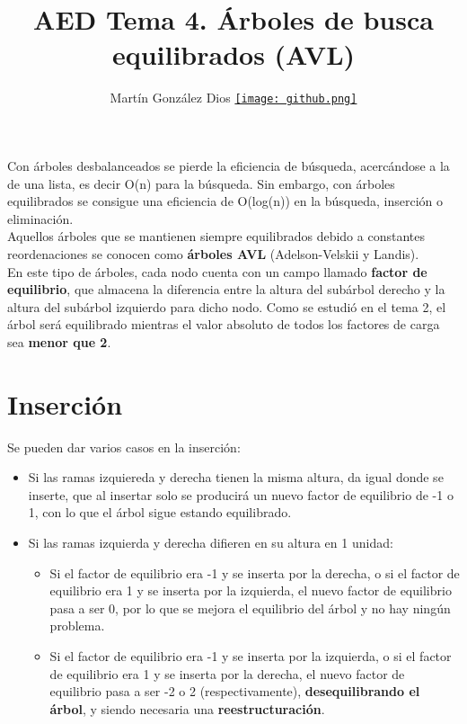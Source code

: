 \documentclass{article}
\title{AED Tema 4. Árboles de busca equilibrados (AVL)}
\author{Martín González Dios
\href{https://github.com/martindios}{\texttt{[image: github.png]}}}
\date{}
\begin{document}
\maketitle

Con árboles desbalanceados se pierde la eficiencia de búsqueda, acercándose a la de una lista, es
decir O(n) para la búsqueda. Sin embargo, con árboles equilibrados se consigue una eficiencia
de O(log(n)) en la búsqueda, inserción o eliminación. \\

Aquellos árboles que se mantienen siempre equilibrados debido a constantes reordenaciones
se conocen como \textbf{árboles AVL} (Adelson-Velskii y Landis). \\

En este tipo de árboles, cada nodo cuenta con un campo llamado \textbf{factor de equilibrio},
que almacena la diferencia entre la altura del subárbol derecho y la altura del subárbol izquierdo
para dicho nodo. Como se estudió en el tema 2, el árbol será equilibrado mientras el valor
absoluto de todos los factores de carga sea \textbf{menor que 2}.

\section{Inserción}
Se pueden dar varios casos en la inserción:
\begin{itemize}
    \item Si las ramas izquiereda y derecha tienen la misma altura, da igual donde se inserte, que al insertar solo se producirá un nuevo factor de equilibrio de -1 o 1, con lo que el árbol sigue estando equilibrado.

    \item Si las ramas izquierda y derecha difieren en su altura en 1 unidad:
        \begin{itemize}
            \item Si el factor de equilibrio era -1 y se inserta por la derecha, o si el factor de equilibrio era 1 y se inserta por la izquierda, el nuevo factor de equilibrio pasa a ser 0, por lo que se mejora el equilibrio del árbol y no hay ningún problema.

            \item Si el factor de equilibrio era -1 y se inserta por la izquierda, o si el factor de equilibrio era 1 y se inserta por la derecha, el nuevo factor de equilibrio pasa a ser -2 o 2 (respectivamente), \textbf{desequilibrando el árbol}, y siendo necesaria una \textbf{reestructuración}.
        \end{itemize}
\end{itemize}
\end{document}
